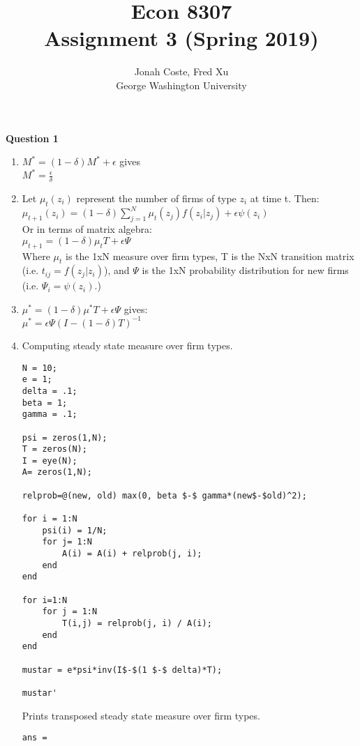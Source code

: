 \documentclass[12pt]{article}
\begin{document}
\begin{onehalfspace}


\title{Econ 8307\\ Assignment 3 (Spring 2019)}
\author{Jonah Coste, Fred Xu\\George Washington University}
\date{}
\maketitle
\parskip 10pt
\textbf{Question 1}
\begin{enumerate}[1.]
    \item
    $M^* = (1-\delta)M^* + \epsilon$ gives\\ $M^*= \frac{\epsilon}{\delta}$
    \item
    Let $\mu_t(z_i)$ represent the number of firms of type $z_i$ at time t. Then:\\
    $\mu_{t+1}(z_i) = (1-\delta)\sum_{j=1}^N{\mu_t(z_j)f(z_i|z_j)} + \epsilon\psi(z_i)$\\
    Or in terms of matrix algebra:\\
    $\mu_{t+1} = (1-\delta)\mu_tT + \epsilon\Psi$\\
    Where $\mu_t$ is the 1xN measure over firm types, T is the NxN transition matrix (i.e. $t_{ij} = f(z_j|z_i)$), and $\Psi$ is the 1xN probability distribution for new firms (i.e. $\Psi_i = \psi(z_i)$.)
    \item
    $\mu^* = (1-\delta)\mu^*T + \epsilon\Psi$ gives:\\
    $\mu^* = \epsilon\Psi(I-(1-\delta)T)^{-1}$
    
    \item
    Computing steady state measure over firm types.
    \begin{lstlisting}
N = 10;
e = 1;
delta = .1;
beta = 1;
gamma = .1;

psi = zeros(1,N);
T = zeros(N);
I = eye(N);
A= zeros(1,N);

relprob=@(new, old) max(0, beta $-$ gamma*(new$-$old)^2);

for i = 1:N
    psi(i) = 1/N;
    for j= 1:N
        A(i) = A(i) + relprob(j, i);
    end
end

for i=1:N
    for j = 1:N
        T(i,j) = relprob(j, i) / A(i);
    end
end

mustar = e*psi*inv(I$-$(1 $-$ delta)*T);

mustar'
    \end{lstlisting}
    Prints transposed steady state measure over firm types.
    \begin{lstlisting}
ans =


\end{lstlisting}
\end{enumerate}
\end{onehalfspace}
\end{document}
